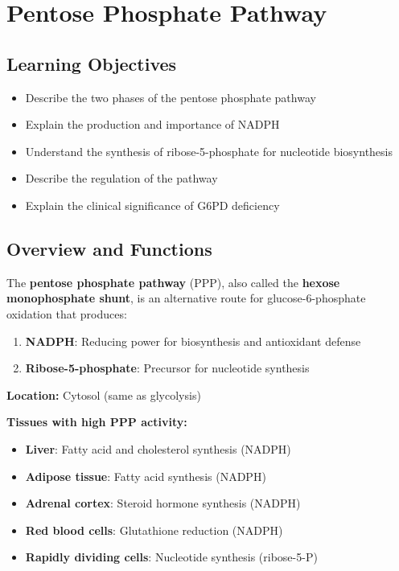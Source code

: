\section{Pentose Phosphate Pathway}

\subsection{Learning Objectives}
\begin{itemize}
    \item Describe the two phases of the pentose phosphate pathway
    \item Explain the production and importance of NADPH
    \item Understand the synthesis of ribose-5-phosphate for nucleotide biosynthesis
    \item Describe the regulation of the pathway
    \item Explain the clinical significance of G6PD deficiency
\end{itemize}

\subsection{Overview and Functions}

\begin{definition}
The \textbf{pentose phosphate pathway} (PPP), also called the \textbf{hexose monophosphate shunt}, is an alternative route for glucose-6-phosphate oxidation that produces:
\begin{enumerate}
    \item \textbf{NADPH}: Reducing power for biosynthesis and antioxidant defense
    \item \textbf{Ribose-5-phosphate}: Precursor for nucleotide synthesis
\end{enumerate}
\end{definition}

\textbf{Location:} Cytosol (same as glycolysis)

\textbf{Tissues with high PPP activity:}
\begin{itemize}
    \item \textbf{Liver}: Fatty acid and cholesterol synthesis (NADPH)
    \item \textbf{Adipose tissue}: Fatty acid synthesis (NADPH)
    \item \textbf{Adrenal cortex}: Steroid hormone synthesis (NADPH)
    \item \textbf{Red blood cells}: Glutathione reduction (NADPH)
    \item \textbf{Rapidly dividing cells}: Nucleotide synthesis (ribose-5-P)
\end{itemize}

